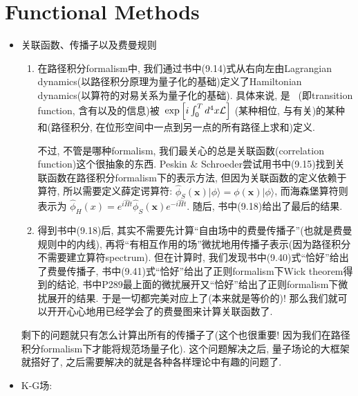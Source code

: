 \chapter{Functional Methods}

\begin{itemize}
  \item 关联函数、传播子以及费曼规则
        \begin{enumerate}
          \item 在路径积分formalism中, 我们通过书中(9.14)式从右向左由Lagrangian dynamics(以路径积分原理为量子化的基础)定义了Hamiltonian dynamics(以算符的对易关系为量子化的基础).
                具体来说, 是\ {} (即transition function, 含有以及的信息)被\ {\color{Maroon}$\exp{\Bigl[i\int_0^T d^4 x \mathcal{L}}\Bigr]$} (某种相位, 与有关)的{\color{Maroon}某种和}(路径积分, 在位形空间中一点到另一点的所有路径上求和)定义.

                不过, 不管是哪种formalism, 我们最关心的总是关联函数(correlation function)这个很抽象的东西.
                Peskin \& Schroeder尝试用书中(9.15)找到关联函数在路径积分formalism下的表示方法, 但因为关联函数的定义依赖于算符, 所以需要定义薛定谔算符: $\hat{\phi}_S(\mathbf{x})|\phi\rangle = \phi(\mathbf{x})|\phi\rangle$, 而海森堡算符则表示为 $\hat{\phi}_H(x) = e^{i\hat{H}t}\hat{\phi}_S(\mathbf{x}) e^{-i\hat{H}t}$. 随后, 书中(9.18)给出了最后的结果.

          \item 得到书中(9.18)后, 其实不需要先计算“自由场中的费曼传播子”(也就是费曼规则中的内线), 再将“有相互作用的场”微扰地用传播子表示(因为路径积分不需要建立算符spectrum).
                但在计算时, 我们发现书中(9.40)式“恰好”给出了费曼传播子, 书中(9.41)式“恰好”给出了正则formalism下Wick theorem得到的结论, 书中P289最上面的微扰展开又“恰好”给出了正则formalism下微扰展开的结果.
                于是一切都完美对应上了(本来就是等价的)! 那么我们就可以开开心心地用已经学会了的费曼图来计算关联函数了.
        \end{enumerate}

        剩下的问题就只有怎么计算出所有的传播子了(这个也很重要! 因为我们在路径积分formalism下才能将规范场量子化). 
        这个问题解决之后, 量子场论的大框架就搭好了, 之后需要解决的就是各种各样理论中有趣的问题了.

        \clearpage

  \item K-G场:


\end{itemize}
